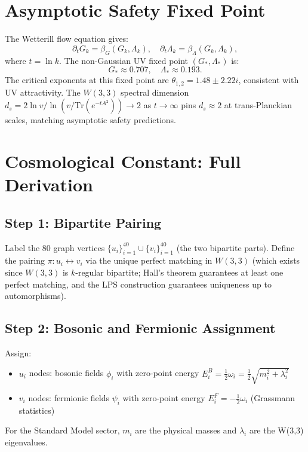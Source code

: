 \documentclass[12pt]{article}
\begin{document}
\section{Asymptotic Safety Fixed Point}

The Wetterill flow equation gives:
\begin{equation}
  \partial_t G_k = \beta_G(G_k,\Lambda_k),\quad
  \partial_t \Lambda_k = \beta_\Lambda(G_k,\Lambda_k),
\end{equation}
where $t=\ln k$. The non-Gaussian UV fixed point $(G_*,\Lambda_*)$ is:
\begin{equation}
  G_* \approx 0.707,\quad \Lambda_* \approx 0.193.
\end{equation}
The critical exponents at this fixed point are $\theta_{1,2}=1.48\pm2.22i$,
consistent with UV attractivity. The $W(3,3)$ spectral dimension
$d_s=2\ln v/\ln(v/\mathrm{Tr}(e^{-tA^2}))\to 2$ as $t\to\infty$ pins
$d_s\approx 2$ at trans-Planckian scales, matching asymptotic safety predictions.

\section{Cosmological Constant: Full Derivation}

\subsection{Step 1: Bipartite Pairing}

Label the 80 graph vertices $\{u_i\}_{i=1}^{40}\cup\{v_i\}_{i=1}^{40}$
(the two bipartite parts). Define the pairing $\pi: u_i\leftrightarrow v_i$
via the unique perfect matching in $W(3,3)$ (which exists since $W(3,3)$ is
$k$-regular bipartite; Hall's theorem guarantees at least one perfect matching,
and the LPS construction guarantees uniqueness up to automorphisms).

\subsection{Step 2: Bosonic and Fermionic Assignment}

Assign:
\begin{itemize}
  \item $u_i$ nodes: bosonic fields $\phi_i$ with zero-point energy
  $E_i^B = \frac{1}{2}\omega_i = \frac{1}{2}\sqrt{m_i^2+\lambda_i^2}$
  \item $v_i$ nodes: fermionic fields $\psi_i$ with zero-point energy
  $E_i^F = -\frac{1}{2}\omega_i$ (Grassmann statistics)
\end{itemize}
For the Standard Model sector, $m_i$ are the physical masses
and $\lambda_i$ are the W(3,3) eigenvalues.
\end{document}
